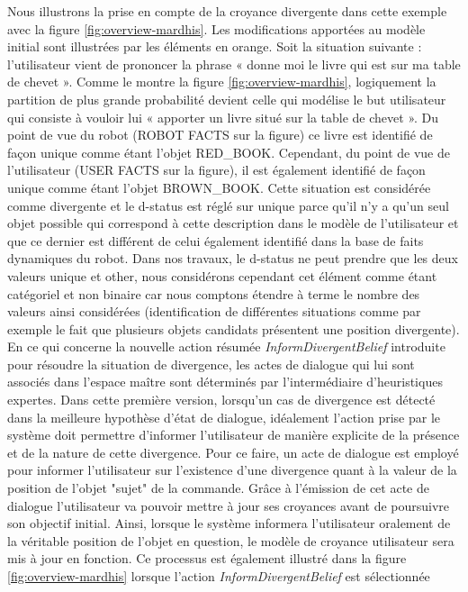 \documentclass[a4paper,11pt,twoside]{StyleThese}
\begin{document}
Nous illustrons la prise en compte de la croyance divergente dans cette exemple avec la figure \ref{fig:overview-mardhis}. Les modifications apportées au modèle initial sont illustrées par les éléments en
orange. 
Soit la situation suivante :
l’utilisateur vient de prononcer la phrase « donne moi le livre qui est sur ma table de
chevet ». Comme le montre la figure \ref{fig:overview-mardhis}, logiquement la partition de plus grande probabilité devient celle qui modélise le but utilisateur qui consiste à vouloir lui « apporter
un livre situé sur la table de chevet ». Du point de vue du robot (ROBOT FACTS sur
la figure) ce livre est identifié de façon unique comme étant l’objet RED\_BOOK. Cependant,
du point de vue de l’utilisateur (USER FACTS sur la figure), il est également identifié
de façon unique comme étant l’objet BROWN\_BOOK. Cette situation est considérée
comme divergente et le d-status est réglé sur unique parce qu’il n’y a qu’un seul objet possible qui correspond à cette description dans le modèle de l’utilisateur et que
ce dernier est différent de celui également identifié dans la base de faits dynamiques
du robot. Dans nos travaux, le d-status ne peut prendre que les deux valeurs unique et
other, nous considérons cependant cet élément comme étant catégoriel et non binaire
car nous comptons étendre à terme le nombre des valeurs ainsi considérées (identification de différentes situations comme par exemple le fait que plusieurs objets candidats
présentent une position divergente).
En ce qui concerne la nouvelle action résumée \textit{InformDivergentBelief} introduite pour
résoudre la situation de divergence, les actes de dialogue qui lui sont associés dans
l’espace maître sont déterminés par l’intermédiaire d’heuristiques expertes. Dans cette
première version, lorsqu’un cas de divergence est détecté dans la meilleure hypothèse
d’état de dialogue, idéalement l’action prise par le système doit permettre d’informer
l’utilisateur de manière explicite de la présence et de la nature de cette divergence.
Pour ce faire, un acte de dialogue est employé pour informer l’utilisateur sur l’existence d’une divergence quant à la valeur de la position de l’objet "sujet"
de la commande. Grâce à l’émission de cet acte de dialogue l’utilisateur va pouvoir
mettre à jour ses croyances avant de poursuivre son objectif initial. Ainsi, lorsque le
système informera l’utilisateur oralement de la véritable position de l’objet en question, le modèle de croyance utilisateur sera mis à jour en fonction. Ce processus est également illustré dans la figure \ref{fig:overview-mardhis} lorsque l’action \textit{InformDivergentBelief} est sélectionnée
\end{document}
